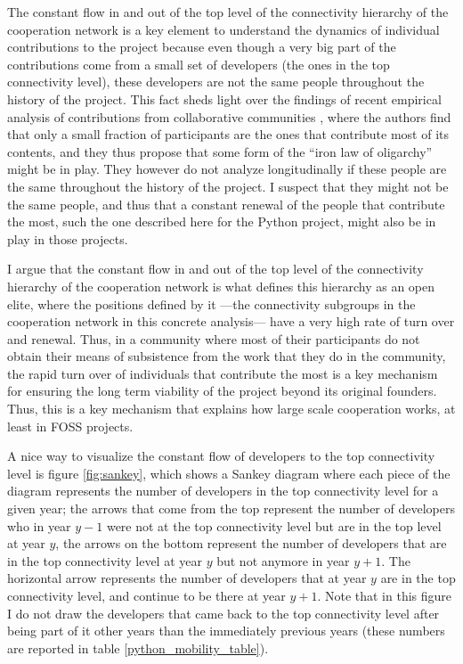 The constant flow in and out of the top level of the connectivity hierarchy of the cooperation network is a key element to understand the dynamics of individual contributions to the project because even though a very big part of the contributions come from a small set of developers (the ones in the top connectivity level), these developers are not the same people throughout the history of the project. This fact sheds light over the findings of recent empirical analysis of contributions from collaborative communities \citep{shaw:2014}, where the authors find that only a small fraction of participants are the ones that contribute most of its contents, and they thus propose that some form of the ``iron law of oligarchy'' might be in play. They however do not analyze longitudinally if these people are the same throughout the history of the project. I suspect that they might not be the same people, and thus that a constant renewal of the people that contribute the most, such the one described here for the Python project, might also be in play in those projects.  

I argue that the constant flow in and out of the top level of the connectivity hierarchy of the cooperation network is what defines this hierarchy as an open elite, where the positions defined by it ---the connectivity subgroups in the cooperation network in this concrete analysis--- have a very high rate of turn over and renewal. Thus, in a community where most of their participants do not obtain their means of subsistence from the work that they do in the community, the rapid turn over of individuals that contribute the most is a key mechanism for ensuring the long term viability of the project beyond its original founders. Thus, this is a key mechanism that explains how large scale cooperation works, at least in FOSS projects.

A nice way to visualize the constant flow of developers to the top connectivity level is figure \ref{fig:sankey}, which shows a Sankey diagram where each piece of the diagram represents the number of developers in the top connectivity level for a given year; the arrows that come from the top represent the number of developers who in year $y - 1$ were not at the top connectivity level but are in the top level at year $y$, the arrows on the bottom represent the number of developers that are in the top connectivity level at year $y$ but not anymore in year $y + 1$. The horizontal arrow represents the number of developers that at year $y$ are in the top connectivity level, and continue to be there at year $y + 1$. Note that in this figure I do not draw the developers that came back to the top connectivity level after being part of it other years than the immediately previous years (these numbers are reported in table \ref{python_mobility_table}).

